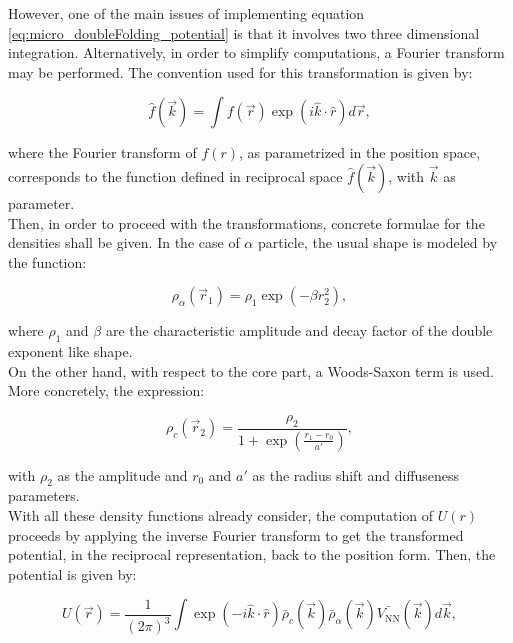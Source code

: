 \documentclass[openany]{book}
\begin{document}
However, one of the main issues of implementing equation \ref{eq:micro_doubleFolding_potential} is that it involves two three dimensional integration. Alternatively, in order to simplify computations, a Fourier transform may be performed. The convention used for this transformation is given by: 

\begin{equation}\label{eq:micro_doubleFolding_fourierTransform}
	\hat f(\vec k) = \int f(\vec r) \exp(i \hat k \cdot \hat r) d \vec r,
\end{equation}

where the Fourier transform of $f(r)$, as parametrized in the position space, corresponds to the function defined in reciprocal space $\hat f(\vec k)$, with $\vec k$ as parameter. \\

Then, in order to proceed with the transformations, concrete formulae for the densities shall be given. In the case of  $\alpha$ particle, the usual shape is modeled by the function:

\begin{equation}\label{eq:micro_doubleFolding_potential_rhoalpha}
	\rho_\alpha (\vec r_1) = \rho_1 \exp (-\beta r^2_2),
\end{equation}

where $\rho_1$ and $\beta$ are the characteristic amplitude and decay factor of the double exponent like shape. \\

On the other hand, with respect to the core part, a Woods-Saxon term is used. More concretely, the expression: 

\begin{equation}\label{eq:micro_doubleFolding_potential_rhoC}
	\rho_c(\vec r_2) =  \frac{\rho_2}{1 + \exp {\left(\frac{r_1 - r_0}{a'}\right)}},
\end{equation}

with $\rho_2$ as the amplitude and $r_0$ and $a'$ as the radius shift and diffuseness parameters. \\ 

With all these density functions already consider, the computation of $U(r)$ proceeds by applying the inverse Fourier transform to get the transformed potential, in the reciprocal representation, back to the position form. Then, the potential is given by:

\begin{equation}\label{eq:micro_doubleFolding_potential_Fourier}
	U(\vec r ) = \frac{1}{(2\pi)^3} \int { \exp{(-i\hat k \cdot \hat r )} \bar {\rho}_c(\vec k)  \bar {\rho}_\alpha (\vec k) \bar{V_{\mathrm{NN}}}(\vec k)  d\vec k},
\end{equation}
\end{document}
